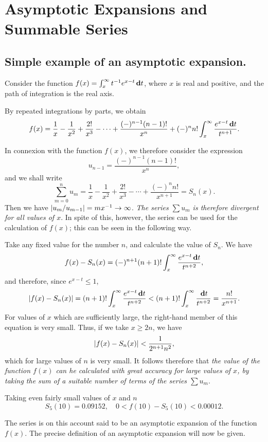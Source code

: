 \chapter{Asymptotic Expansions and Summable Series}

\section{Simple example of an asymptotic expansion.}

Consider the function
$f(x) = \int_{x}^{\infty} t^{-1} e^{x-t} \, \mathbf{d} t$,
where $x$ is real and positive, and the path of integration is the
real axis.

By repeated integrations by parts, we obtain
$$
f(x)
=
\frac{1}{x}
- \frac{1}{x^{2}}
+ \frac{2!}{x^{3}}
- \cdots
+ \frac{ (-)^{n-1} (n-1)!}{x^{n}}
+ (-)^{n} n! \int_{x}^{\infty} \frac{e^{x-t} \, \mathbf{d} t}{t^{n+1}}.
$$

In connexion with the function $f(x)$, we therefore consider the
expression
$$
u_{n-1}
=
\frac{ (-)^{n-1} (n-1)!}{x^{n}},
$$
and we shall write
$$
\sum_{m=0}^{n}
u_{m}
=
\frac{1}{x}
- \frac{1}{x^{2}}
+ \frac{2!}{x^{3}}
- \cdots
+ \frac{ (-)^{n} n!}{x^{n+1}}
=
S_{n}(x).
$$
Then we have $\left| u_{m}/u_{m-1} \right| = mx^{-1} \rightarrow \infty$.
\emph{The series $\sum u_{m}$ is therefore divergent for all values of
  $x$}. 
In spite of this, however, the series can
be used for the calculation of $f(x)$; this can be seen in the following way.

Take any fixed value for the number $n$, and calculate the value of $S_{n}$.
We have
$$
f(x) - S_{n}(x)
=
(-)^{n+1} (n+1)! 
\int_{x}^{\infty} \frac{e^{x-t} \, \mathbf{d} t}{t^{n+2}},
$$
and therefore, since $e^{x-t} \leq 1$,
$$
\left|  f(x) - S_{n}(x)  \right|
=
(n+1)!
\int_{x}^{\infty}
\frac{e^{x-t} \, \mathbf{d} t}{t^{n+2}}
<
(n+1)!
\int_{x}^{\infty} \frac{\, \mathbf{d} t}{t^{n+2}}
=
\frac{n!}{x^{n+1}}.
$$
For values of $x$ which are sufficiently large, the right-hand member
of this equation is very small. Thus, if we take $x \geq 2n$, we have
$$
\left|  f(x) - S_{n}(x) \right|
<
\frac{1}{2^{n+1} n^{2}},
$$
which for large values of $n$ is very small. It follows therefore that
\emph{the value of the function $f(x)$ can he calculated with great
  accuracy for large values of $x$, by taking the sum of a suitable
  number of terms of the series $\sum u_{m}$}.

Taking even fairly small values of $x$ and $n$
$$
S_{5}(10) = 0.09152,
\quad
0 < f(10) - S_{5}(10) < 0.00012.
$$
%
%

The series is on this account said to be an asymptotic expansion of the
function $f(x)$. The precise definition of an asymptotic expansion will now
be given.

